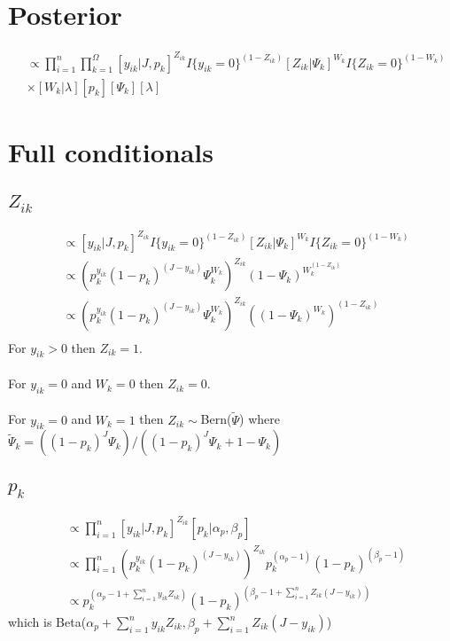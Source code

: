 \documentclass[fleqn]{article}
\def\bm#1{\mbox{\boldmath $#1$}}
\begin{document}
\section{Posterior}
%
\begin{align*}
  [\bm{Z}, \bm{p}, \bm{\Psi}, \bm{W}, \lambda | \bm{y}, J] & \propto \prod_{i = 1}^n \prod_{k = 1}^\Omega [y_{ik} | J, p_k]^{Z_{ik}} I\{y_{ik} = 0 \}^{(1 -  Z_{ik})} [Z_{ik} | \Psi_k]^{W_k} I\{Z_{ik} = 0 \}^{(1 -  W_k)}\\
  & \times [W_k | \lambda] [p_k] [\Psi_k] [\lambda]
\end{align*}
%
\section{Full conditionals}
%
\subsection{$Z_{ik}$}
%
\begin{align*}
  [Z_{ik} | \cdot] & \propto [y_{ik} | J, p_k]^{Z_{ik}} I \{y_{ik} = 0 \}^{(1 - Z_{ik})} [Z_{ik} | \Psi_k]^{W_k} I \{Z_{ik} = 0 \}^{(1 - W_{k})}\\
   & \propto \left(p_k^{y_{ik}} (1 - p_k)^{(J - y_{ik})} \Psi_k^{W_k} \right)^{Z_{ik}} \left(1 - \Psi_k \right)^{W_k^{(1 - Z_{ik})}}\\
  & \propto \left(p_k^{y_{ik}} (1 - p_k)^{(J - y_{ik})} \Psi_k^{W_k} \right)^{Z_{ik}} \left((1 - \Psi_k)^{W_k} \right)^{(1 - Z_{ik})}\\
\end{align*}
For $y_{ik} > 0$ then $Z_{ik} = 1$.\\
\\
For $y_{ik} = 0$ and $W_k = 0$ then $Z_{ik} = 0$.\\
\\
For $y_{ik} = 0$ and $W_k = 1$ then $Z_{ik} \sim $Bern($\tilde{\Psi}$) where $\tilde{\Psi}_k = \left( (1 - p_k)^J \Psi_k \right) / \left( (1 - p_k)^J \Psi_k + 1 - \Psi_k \right)$\\
%
\subsection{$p_k$}
%
\begin{align*}
  [p_k | \cdot] & \propto \prod_{i = 1}^n [y_{ik} | J, p_k]^{Z_{ik}} [p_k | \alpha_p, \beta_p]\\
  & \propto \prod_{i = 1}^n \left( p_k^{y_{ik}} (1 - p_k)^{(J - y_{ik})} \right)^{Z_{ik}} p_k^{(\alpha_p - 1)} (1 - p_k)^{(\beta_p - 1)}\\
    & \propto p_k^{\left( \alpha_p - 1 + \sum_{i = 1}^n y_{ik} Z_{ik} \right)} (1 - p_k)^{\left( \beta_p - 1 + \sum_{i = 1}^n Z_{ik} (J - y_{ik}) \right)}
\end{align*}
%
which is Beta($\alpha_p + \sum_{i = 1}^n y_{ik} Z_{ik}, \beta_p + \sum_{i = 1}^n Z_{ik} (J - y_{ik})$)
%
\end{document}
